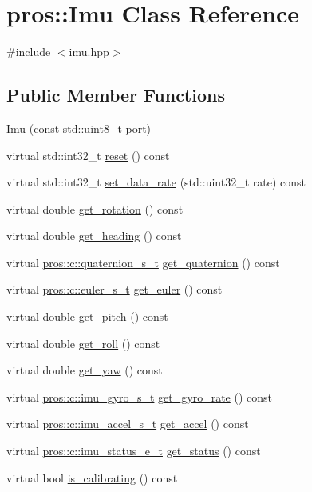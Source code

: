 \hypertarget{classpros_1_1Imu}{}\section{pros\+:\+:Imu Class Reference}
\label{classpros_1_1Imu}


{\ttfamily \#include $<$imu.\+hpp$>$}

\subsection*{Public Member Functions}
\begin{DoxyCompactItemize}
\item 
\hyperlink{classpros_1_1Imu_aac194322ec0563c1c73f540733e7cc4e}{Imu} (const std\+::uint8\+\_\+t port)
\item 
virtual std\+::int32\+\_\+t \hyperlink{classpros_1_1Imu_ad7973cfad5f8f83e7007342055197c43}{reset} () const
\item 
virtual std\+::int32\+\_\+t \hyperlink{classpros_1_1Imu_adb0b63f2de5f41b664fff4a60a808ba5}{set\+\_\+data\+\_\+rate} (std\+::uint32\+\_\+t rate) const
\item 
virtual double \hyperlink{classpros_1_1Imu_ac8bd7a19a6b4fc0c207a895efd3f0b48}{get\+\_\+rotation} () const
\item 
virtual double \hyperlink{classpros_1_1Imu_a35c7953c5def3c034763af25c4dbebe3}{get\+\_\+heading} () const
\item 
virtual \hyperlink{imu_8h_a1f3d4bf4251e6ce7cb374297de6390a1}{pros\+::c\+::quaternion\+\_\+s\+\_\+t} \hyperlink{classpros_1_1Imu_a3656b2476bb3ab8c2539615f76a0db39}{get\+\_\+quaternion} () const
\item 
virtual \hyperlink{imu_8h_a93e80020ec907b7e11ac7166e5d01c55}{pros\+::c\+::euler\+\_\+s\+\_\+t} \hyperlink{classpros_1_1Imu_acd2f926bc97121518da774eefe6fc9e2}{get\+\_\+euler} () const
\item 
virtual double \hyperlink{classpros_1_1Imu_a9d9e7ad1da6ea8877c48e1b4fadfe8ee}{get\+\_\+pitch} () const
\item 
virtual double \hyperlink{classpros_1_1Imu_a8ec8c7bbb7ee9d9d1c9dca5d992c57b1}{get\+\_\+roll} () const
\item 
virtual double \hyperlink{classpros_1_1Imu_aa2dd2dec5b1a91d4358c23afd8f0f1bd}{get\+\_\+yaw} () const
\item 
virtual \hyperlink{imu_8h_a5b9e240cfb181cce3c741e29efbbbf23}{pros\+::c\+::imu\+\_\+gyro\+\_\+s\+\_\+t} \hyperlink{classpros_1_1Imu_a632aecd3cf0866827ba6521dc19f357d}{get\+\_\+gyro\+\_\+rate} () const
\item 
virtual \hyperlink{imu_8h_a70eb3173193f4f46266eade4c243f662}{pros\+::c\+::imu\+\_\+accel\+\_\+s\+\_\+t} \hyperlink{classpros_1_1Imu_ac9a047f46e7ae8d73a6189091df20150}{get\+\_\+accel} () const
\item 
virtual \hyperlink{imu_8h_a7d3682de24c3a459dddda55d65793309}{pros\+::c\+::imu\+\_\+status\+\_\+e\+\_\+t} \hyperlink{classpros_1_1Imu_ad38c8f55b89f8d2e7b68a6bda0029559}{get\+\_\+status} () const
\item 
virtual bool \hyperlink{classpros_1_1Imu_af7426c086f6f810cca98f4e77765189c}{is\+\_\+calibrating} () const
\end{DoxyCompactItemize}


